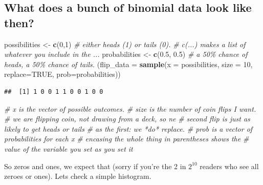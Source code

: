 \documentclass[
]{book}
\newenvironment{Shaded}{\begin{snugshade}}{\end{snugshade}}
\newcommand{\CommentTok}[1]{\textcolor[rgb]{0.56,0.35,0.01}{\textit{#1}}}
\newcommand{\DataTypeTok}[1]{\textcolor[rgb]{0.13,0.29,0.53}{#1}}
\newcommand{\DecValTok}[1]{\textcolor[rgb]{0.00,0.00,0.81}{#1}}
\newcommand{\FloatTok}[1]{\textcolor[rgb]{0.00,0.00,0.81}{#1}}
\newcommand{\KeywordTok}[1]{\textcolor[rgb]{0.13,0.29,0.53}{\textbf{#1}}}
\newcommand{\NormalTok}[1]{#1}
\newcommand{\OtherTok}[1]{\textcolor[rgb]{0.56,0.35,0.01}{#1}}
\newcommand{\StringTok}[1]{\textcolor[rgb]{0.31,0.60,0.02}{#1}}
\begin{document}
\hypertarget{what-does-a-bunch-of-binomial-data-look-like-then}{%
\subsection{What does a bunch of binomial data look like then?}\label{what-does-a-bunch-of-binomial-data-look-like-then}}

\begin{Shaded}
\begin{Highlighting}[]
\NormalTok{possibilities \textless{}{-}}\StringTok{ }\KeywordTok{c}\NormalTok{(}\DecValTok{0}\NormalTok{,}\DecValTok{1}\NormalTok{) }\CommentTok{\# either heads (1) or tails (0).}
                        \CommentTok{\# c(...) makes a list of whatever you include in the ...}
\NormalTok{probabilities \textless{}{-}}\StringTok{ }\KeywordTok{c}\NormalTok{(}\FloatTok{0.5}\NormalTok{, }\FloatTok{0.5}\NormalTok{)}
                        \CommentTok{\# a 50\% chance of heads, a 50\% chance of tails.}
\NormalTok{(}\DataTypeTok{flip\_data =} \KeywordTok{sample}\NormalTok{(}\DataTypeTok{x =}\NormalTok{ possibilities, }\DataTypeTok{size =} \DecValTok{10}\NormalTok{, }\DataTypeTok{replace=}\OtherTok{TRUE}\NormalTok{, }\DataTypeTok{prob=}\NormalTok{probabilities))}
\end{Highlighting}
\end{Shaded}

\begin{verbatim}
##  [1] 1 0 0 1 1 0 0 1 0 0
\end{verbatim}

\begin{Shaded}
\begin{Highlighting}[]
                        \CommentTok{\# x is the vector of possible outcomes.}
                        \CommentTok{\# size is the number of coin flips I want.}
                        \CommentTok{\# we are flipping coin, not drawing from a deck, so ne}
                        \CommentTok{\#   second flip is just as likely to get heads or tails}
                        \CommentTok{\#   as the first: we *do* replace.}
                        \CommentTok{\# prob is a vector of probabilities for each x}
                        \CommentTok{\# encasing the whole thing in parentheses shows the}
                        \CommentTok{\#   value of the variable you set as you set it}
\end{Highlighting}
\end{Shaded}

So zeros and ones, we expect that (sorry if you're the 2 in \(2^{10}\) readers who see all zeroes or ones). Lets check a simple histogram.
\end{document}
